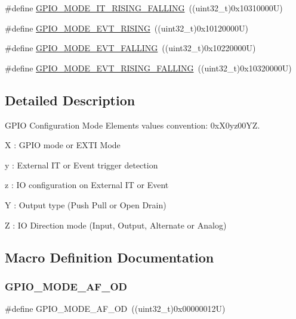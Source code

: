 \begin{DoxyCompactItemize}
\#define \mbox{\hyperlink{group___g_p_i_o__mode__define_ga0678e61090ed61e91a6496f22ddfb3d1}{G\+P\+I\+O\+\_\+\+M\+O\+D\+E\+\_\+\+I\+T\+\_\+\+R\+I\+S\+I\+N\+G\+\_\+\+F\+A\+L\+L\+I\+NG}}~((uint32\+\_\+t)0x10310000\+U)
\item 
\#define \mbox{\hyperlink{group___g_p_i_o__mode__define_ga97d78b82ea178ff7a4c35aa60b4e9338}{G\+P\+I\+O\+\_\+\+M\+O\+D\+E\+\_\+\+E\+V\+T\+\_\+\+R\+I\+S\+I\+NG}}~((uint32\+\_\+t)0x10120000\+U)
\item 
\#define \mbox{\hyperlink{group___g_p_i_o__mode__define_gadbfa532b3566783ac6c0e07c2e0ffe5e}{G\+P\+I\+O\+\_\+\+M\+O\+D\+E\+\_\+\+E\+V\+T\+\_\+\+F\+A\+L\+L\+I\+NG}}~((uint32\+\_\+t)0x10220000\+U)
\item 
\#define \mbox{\hyperlink{group___g_p_i_o__mode__define_ga1b760771297ed2fc55a6b13071188491}{G\+P\+I\+O\+\_\+\+M\+O\+D\+E\+\_\+\+E\+V\+T\+\_\+\+R\+I\+S\+I\+N\+G\+\_\+\+F\+A\+L\+L\+I\+NG}}~((uint32\+\_\+t)0x10320000\+U)
\end{DoxyCompactItemize}


\subsection{Detailed Description}
G\+P\+IO Configuration Mode Elements values convention\+: 0x\+X0yz00\+YZ. 


\begin{DoxyItemize}
\item X \+: G\+P\+IO mode or E\+X\+TI Mode
\item y \+: External IT or Event trigger detection
\item z \+: IO configuration on External IT or Event
\item Y \+: Output type (Push Pull or Open Drain)
\item Z \+: IO Direction mode (Input, Output, Alternate or Analog) 
\end{DoxyItemize}

\subsection{Macro Definition Documentation}
\mbox{\label{group___g_p_i_o__mode__define_ga282b9fd37c8ef31daba314ffae6bf023}} 
\subsubsection{\texorpdfstring{GPIO\_MODE\_AF\_OD}{GPIO\_MODE\_AF\_OD}}
{\footnotesize\ttfamily \#define G\+P\+I\+O\+\_\+\+M\+O\+D\+E\+\_\+\+A\+F\+\_\+\+OD~((uint32\+\_\+t)0x00000012\+U)}

